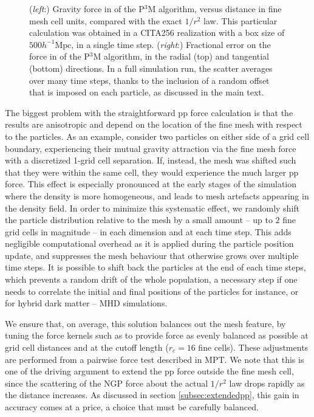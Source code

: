 \begin{figure}
\begin{center}
  \caption{({\it left}:) Gravity force in of the P$^3$M algorithm, versus distance in fine mesh cell units, compared with the exact $1/r^{2}$ law.
    This particular calculation was obtained in a CITA256 realization with  a box size of $500 h^{-1}\mbox{Mpc}$,
    in a single time step. 
    ({\it right}:) Fractional error on the force in of the P$^3$M algorithm, in the radial (top) and tangential (bottom) directions.
  In a full simulation run, the scatter averages over many time steps, 
    thanks to the inclusion of a random offset that is imposed on each particle, as discussed in the main text.
    \label{fig:den_force_fracErr}}
\end{center}
\end{figure}

The biggest problem with the straightforward pp force calculation is that the results 
are anisotropic and depend on the location of the fine mesh with respect 
to the particles. As an example, consider two particles on either side of a grid 
cell boundary, experiencing their mutual gravity attraction via the fine mesh force with a discretized 1-grid cell separation.
 If, instead, the mesh was shifted such that they were
within the same cell, they would experience the much larger pp force. 
This effect is especially pronounced at the early stages of the simulation where
the density is more homogeneous, and leads to mesh artefacts appearing
in the density field. In order to minimize this systematic effect, 
we randomly shift the particle distribution relative to the mesh by a small
amount -- up to 2 fine grid cells in magnitude -- in each
dimension and at each time step.  This adds negligible computational
overhead as it is applied during the particle position update,
and suppresses the mesh behaviour that otherwise grows over multiple time steps.
It is possible to shift back the particles at the end of each time steps,
which prevents a random drift of the whole population, a necessary step 
if one needs to correlate the initial and final positions of the particles for instance,
or for hybrid dark matter -- MHD simulations.
 
We ensure that, on average, this solution balances out the mesh feature,
by tuning the force kernels such as to provide  force as evenly balanced as possible at grid cell distances
and at the cutoff length ($r_{c}=16$ fine cells).
These adjustments are performed from a pairwise force test described in MPT.
We note that this is one of the driving argument to extend the pp force outside the fine mesh cell,
since the scattering of the NGP force about the actual $1/r^{2}$ law drops rapidly as the distance increases.
As discussed in section \ref{subsec:extendedpp}, this gain in accuracy comes at a price,
a choice that  must be carefully balanced.

